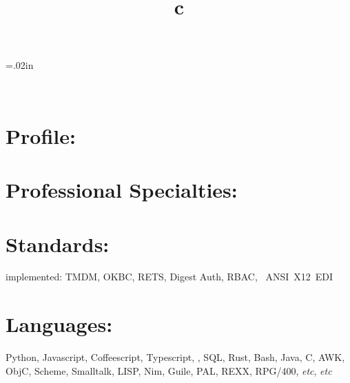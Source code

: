 \documentclass[line,margin,hidelinks]{res}
\begin{document}
\def\resOrCvLink{
  \href{\cvUrl}{full CV}}



\resumewidth=7.2in
\begin{resume}

\end{resume}

\sectionskip=.02in

\begin{format}
\title{c}\\
\end{format}


\section{Profile:
  \maybemugshot
}


\section{Professional Specialties:}


\section{Standards:}
\begin{par}
implemented:
TMDM,
OKBC,
RETS,
Digest Auth,
RBAC,
~ANSI~X12~EDI
\end{par}

\section{Languages:}
\begin{par}
  Python, Javascript, Coffeescript, Typescript, \PS, SQL, Rust, Bash,
  Java, C, AWK, ObjC, Scheme, Smalltalk, LISP, Nim, Guile, PAL, REXX, RPG/400,
  \textit{etc}, \textit{etc}
\end{par}
\end{document}
